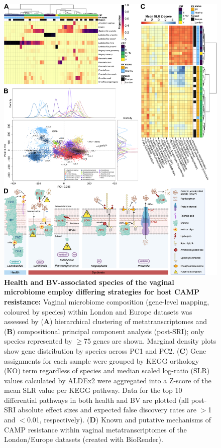 \documentclass[sn-mathphys,Numbered]{sn-jnl}%
\begin{document}
\begin{figure}[H]
    \centering
    \includegraphics[scale=0.8]{0_multipanel_fig2.png}
    \caption{\textbf{Health and BV-associated species of the vaginal microbiome employ differing strategies for host CAMP resistance:} Vaginal microbiome composition (gene-level mapping, coloured by species) within London and Europe datasets was assessed by (\textbf{A}) hierarchical clustering of metatranscriptomes and (\textbf{B}) compositional principal component analysis (post-SRI); only species represented by $\geq$75 genes are shown. Marginal density plots show gene distribution by species across PC1 and PC2. (\textbf{C}) Gene assignments for each sample were grouped by KEGG orthology (KO) term regardless of species and median scaled log-ratio (SLR) values calculated by ALDEx2 were aggregated into a Z-score of the mean SLR value per KEGG pathway. Data for the top 10 differential pathways in both health and BV are plotted (all post-SRI absolute effect sizes and expected false discovery rates are $>$1 and $<$0.01, respectively). (\textbf{D}) Known and putative mechanisms of CAMP resistance within vaginal metatranscriptomes of the London/Europe datasets (created with BioRender).}
    \label{fig:figLonEurSummary}
\end{figure}
\end{document}
